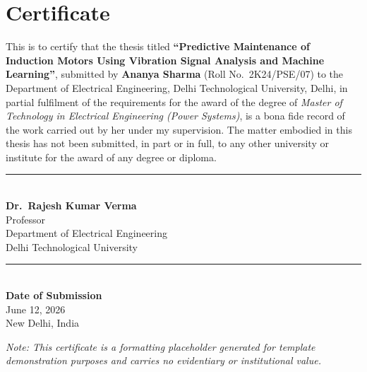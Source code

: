 \chapter*{Certificate}

This is to certify that the thesis titled \textbf{``Predictive Maintenance of Induction Motors
Using Vibration Signal Analysis and Machine Learning''}, submitted by \textbf{Ananya Sharma}
(Roll No.\ 2K24/PSE/07) to the Department of Electrical Engineering, Delhi Technological
University, Delhi, in partial fulfilment of the requirements for the award of the degree of
\textit{Master of Technology in Electrical Engineering (Power Systems)}, is a bona fide record
of the work carried out by her under my supervision. The matter embodied in this thesis has not
been submitted, in part or in full, to any other university or institute for the award of any
degree or diploma.

\vspace{2cm}
\begin{minipage}[t]{0.45\textwidth}
\raggedright
\rule{5cm}{0.4pt}\\
\textbf{Dr.\ Rajesh Kumar Verma}\\
Professor\\
Department of Electrical Engineering\\
Delhi Technological University
\end{minipage}
\hfill
\begin{minipage}[t]{0.45\textwidth}
\raggedleft
\rule{5cm}{0.4pt}\\
\textbf{Date of Submission}\\
June 12, 2026\\
New Delhi, India
\end{minipage}

\vspace{1.3cm}
\noindent\textit{Note: This certificate is a formatting placeholder generated for template
demonstration purposes and carries no evidentiary or institutional value.}

